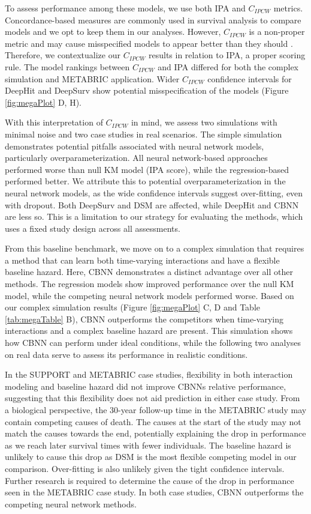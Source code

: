 \documentclass[AMA,STIX1COL,]{WileyNJD-v2}
\begin{document}
To assess performance among these models, we use both IPA and
\(C_{IPCW}\) metrics. Concordance-based measures are commonly used in
survival analysis to compare models and we opt to keep them in our
analyses. However, \(C_{IPCW}\) is a non-proper metric and may cause
misspecified models to appear better than they should
\citep{cindexfails2019}. Therefore, we contextualize our \(C_{IPCW}\)
results in relation to IPA, a proper scoring rule. The model rankings
between \(C_{IPCW}\) and IPA differed for both the complex simulation
and METABRIC application. Wider \(C_{IPCW}\) confidence intervals for
DeepHit and DeepSurv show potential misspecification of the models
(Figure \ref{fig:megaPlot} D, H).

With this interpretation of \(C_{IPCW}\) in mind, we assess two
simulations with minimal noise and two case studies in real scenarios.
The simple simulation demonstrates potential pitfalls associated with
neural network models, particularly overparameterization. All neural
network-based approaches performed worse than null KM model (IPA score),
while the regression-based performed better. We attribute this to
potential overparameterization in the neural network models, as the wide
confidence intervals suggest over-fitting, even with dropout. Both
DeepSurv and DSM are affected, while DeepHit and CBNN are less so. This
is a limitation to our strategy for evaluating the methods, which uses a
fixed study design across all assessments.

From this baseline benchmark, we move on to a complex simulation that
requires a method that can learn both time-varying interactions and have
a flexible baseline hazard. Here, CBNN demonstrates a distinct advantage
over all other methods. The regression models show improved performance
over the null KM model, while the competing neural network models
performed worse. Based on our complex simulation results (Figure
\ref{fig:megaPlot} C, D and Table \ref{tab:megaTable} B), CBNN
outperforms the competitors when time-varying interactions and a complex
baseline hazard are present. This simulation shows how CBNN can perform
under ideal conditions, while the following two analyses on real data
serve to assess its performance in realistic conditions.

In the SUPPORT and METABRIC case studies, flexibility in both
interaction modeling and baseline hazard did not improve CBNNs relative
performance, suggesting that this flexibility does not aid prediction in
either case study. From a biological perspective, the 30-year follow-up
time in the METABRIC study may contain competing causes of death. The
causes at the start of the study may not match the causes towards the
end, potentially explaining the drop in performance as we reach later
survival times with fewer individuals. The baseline hazard is unlikely
to cause this drop as DSM is the most flexible competing model in our
comparison. Over-fitting is also unlikely given the tight confidence
intervals. Further research is required to determine the cause of the
drop in performance seen in the METABRIC case study. In both case
studies, CBNN outperforms the competing neural network methods.
\end{document}
